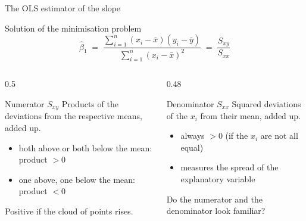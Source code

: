\documentclass[aspectratio=169,11pt]{beamer}
\begin{document}
\begin{frame}{The OLS estimator of the slope}
  \begin{block}{Solution of the minimisation problem}
    \[
      \hat{\beta}_1
      \;=\;
      \frac{\sum_{i=1}^{n} (x_i - \bar{x})(y_i - \bar{y})}
           {\sum_{i=1}^{n} (x_i - \bar{x})^{2}}
      \;=\; \frac{S_{xy}}{S_{xx}}
    \]
  \end{block}

  \begin{columns}[T]
    \begin{column}{0.5\textwidth}
      \begin{block}{Numerator $S_{xy}$}
        Products of the deviations from the respective means, added up.
        \begin{itemize}
          \item both above or both below the mean: product $> 0$
          \item one above, one below the mean: product $< 0$
        \end{itemize}
        Positive if the cloud of points rises.
      \end{block}
    \end{column}
    \begin{column}{0.48\textwidth}
      \begin{block}{Denominator $S_{xx}$}
        Squared deviations of the $x_i$ from their mean, added up.
        \begin{itemize}
          \item always $> 0$ (if the $x_i$ are not all equal)
          \item measures the spread of the explanatory variable
        \end{itemize}
      \end{block}
      \footnotesize Do the numerator and the denominator look familiar?
    \end{column}
  \end{columns}
\end{frame}
\end{document}
